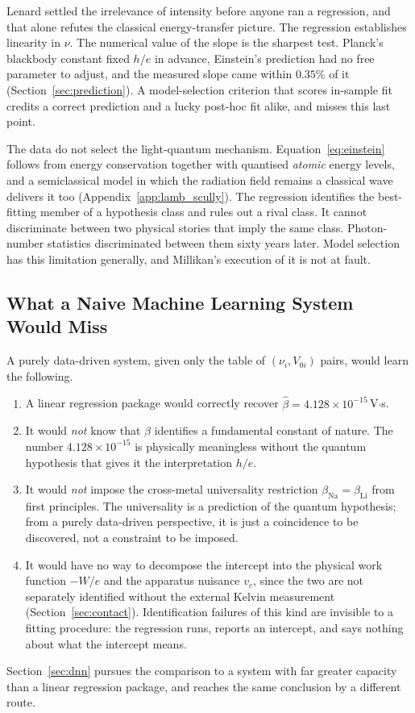 \documentclass[12pt]{article}
\begin{document}
Lenard settled the irrelevance of intensity before anyone ran a regression,
and that alone refutes the classical energy-transfer picture.  The regression
establishes linearity in $\nu$.  The numerical value of the slope is the
sharpest test.  Planck's blackbody constant fixed $h/e$ in advance, Einstein's
prediction had no free parameter to adjust, and the measured slope came within
$0.35\%$ of it (Section~\ref{sec:prediction}).  A model-selection criterion
that scores in-sample fit credits a correct prediction and a lucky post-hoc
fit alike, and misses this last point.

The data do not select the light-quantum mechanism.
Equation~\eqref{eq:einstein} follows from energy conservation together with
quantised \emph{atomic} energy levels, and a semiclassical model in which the
radiation field remains a classical wave delivers it too
(Appendix~\ref{app:lamb_scully}).  The regression identifies the best-fitting
member of a hypothesis class and rules out a rival class.  It cannot
discriminate between two physical stories that imply the same class.
Photon-number statistics discriminated between them sixty years later.  Model
selection has this limitation generally, and Millikan's execution of it is not
at fault.

\subsection{What a Naive Machine Learning System Would Miss}

A purely data-driven system, given only the table of $(\nu_i, V_{0i})$
pairs, would learn the following.

\begin{enumerate}
  \item A linear regression package would correctly recover
    $\hat\beta = 4.128\times10^{-15}$\,V$\cdot$s.
  \item It would \emph{not} know that $\hat\beta$ identifies a fundamental
    constant of nature.  The number $4.128\times10^{-15}$ is physically
    meaningless without the quantum hypothesis that gives it the
    interpretation $h/e$.
  \item It would \emph{not} impose the cross-metal universality
    restriction $\beta_{\mathrm{Na}} = \beta_{\mathrm{Li}}$ from first
    principles.  The universality is a prediction of the quantum hypothesis;
    from a purely data-driven perspective, it is just a coincidence to be
    discovered, not a constraint to be imposed.
  \item It would have no way to decompose the intercept into the physical
    work function $-W/e$ and the apparatus nuisance $v_c$, since the two are
    not separately identified without the external Kelvin measurement
    (Section~\ref{sec:contact}).  Identification failures of this kind are
    invisible to a fitting procedure: the regression runs, reports an
    intercept, and says nothing about what the intercept means.
\end{enumerate}
Section~\ref{sec:dnn} pursues the comparison to a system with far greater
capacity than a linear regression package, and reaches the same conclusion by
a different route.
\end{document}
